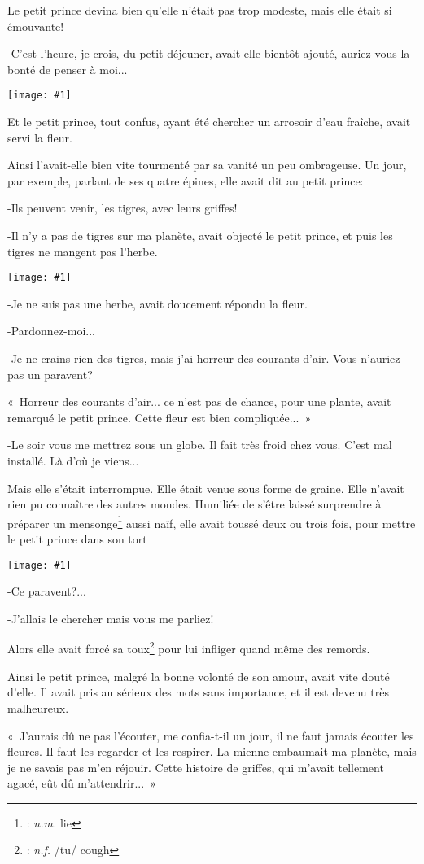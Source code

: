 \documentclass{report}
\newcommand{\pos}[1]{\textit{#1}}
\newcommand{\ft}[3][]{\footnote{%
\if\relax\detokenize{#1}\relax\else#1: \fi%
\if\relax\detokenize{#2}\relax\else\pos{#2} \fi%
#3}}
\newcommand{\incpic}[1]{%
\begin{center}
    \texttt{[image: \#1]}
\end{center}%
}
\begin{document}
Le petit prince devina bien qu'elle n'était pas trop modeste, mais elle était si émouvante!

-C'est l'heure, je crois, du petit déjeuner, avait-elle bientôt ajouté, auriez-vous la bonté de penser à moi...

\incpic{pic/image19.jpeg}

Et le petit prince, tout confus, ayant été chercher un arrosoir d'eau fraîche, avait servi la fleur.

Ainsi l'avait-elle bien vite tourmenté par sa vanité un peu ombrageuse. Un jour, par exemple, parlant de ses quatre épines, elle avait dit au petit prince:

-Ils peuvent venir, les tigres, avec leurs griffes!

-Il n'y a pas de tigres sur ma planète, avait objecté le petit prince, et puis les tigres ne mangent pas l'herbe. 

\incpic{pic/image20.jpeg}

-Je ne suis pas une herbe, avait doucement répondu la fleur.

-Pardonnez-moi...

-Je ne crains rien des tigres, mais j'ai horreur des courants d'air. Vous n'auriez pas un paravent?

«~Horreur des courants d'air... ce n'est pas de chance, pour une plante, avait remarqué le petit prince. Cette fleur est bien compliquée...~»

-Le soir vous me mettrez sous un globe. Il fait très froid chez vous. C'est mal installé. Là d'où je viens...

Mais elle s'était interrompue. Elle était venue sous forme de graine. Elle n'avait rien pu connaître des autres mondes. Humiliée de s'être laissé surprendre à préparer un mensonge\ft[]{n.m.}{lie} aussi naïf, elle avait toussé deux ou trois fois, pour mettre le petit prince dans son tort 

\incpic{pic/image21.jpeg}

-Ce paravent?...

-J'allais le chercher mais vous me parliez!

Alors elle avait forcé sa toux\ft[]{n.f.}{/tu/ cough} pour lui infliger quand même des remords.

Ainsi le petit prince, malgré la bonne volonté de son amour, avait vite douté d'elle. Il avait pris au sérieux des mots sans importance, et il est devenu très malheureux.

«~J'aurais dû ne pas l'écouter, me confia-t-il un jour, il ne faut jamais écouter les fleures. Il faut les regarder et les respirer. La mienne embaumait ma planète, mais je ne savais pas m'en réjouir. Cette histoire de griffes, qui m'avait tellement agacé, eût dû m'attendrir...~»
\end{document}
